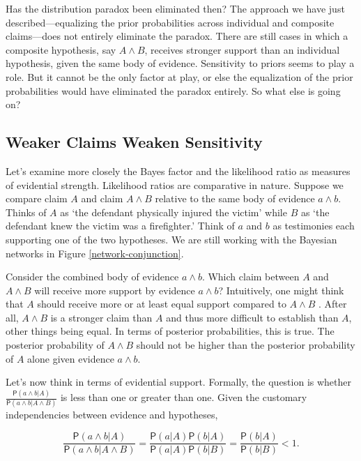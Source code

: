 \documentclass[
  10pt,
  dvipsnames,enabledeprecatedfontcommands]{scrartcl}
\newcommand{\pr}[1]{\mathsf{P}(#1)}
\begin{document}
Has the distribution paradox been eliminated then? The approach we have
just described---equalizing the prior probabilities across individual
and composite claims---does not entirely eliminate the paradox. There
are still cases in which a composite hypothesis, say \(A \wedge B\),
receives stronger support than an individual hypothesis, given the same
body of evidence. Sensitivity to priors seems to play a role. But it
cannot be the only factor at play, or else the equalization of the prior
probabilities would have eliminated the paradox entirely. So what else
is going on?

\hypertarget{weaker-claims-weaken-sensitivity}{%
\subsection{Weaker Claims Weaken
Sensitivity}\label{weaker-claims-weaken-sensitivity}}

Let's examine more closely the Bayes factor and the likelihood ratio as
measures of evidential strength. Likelihood ratios are comparative in
nature. Suppose we compare claim \(A\) and claim \(A\wedge B\) relative
to the same body of evidence \(a\wedge b\). Thinks of \(A\) as `the
defendant physically injured the victim' while \(B\) as `the defendant
knew the victim was a firefighter.' Think of \(a\) and \(b\) as
testimonies each supporting one of the two hypotheses. We are still
working with the Bayesian networks in Figure \ref{network-conjunction}.

Consider the combined body of evidence \(a\wedge b\). Which claim
between \(A\) and \(A\wedge B\) will receive more support by evidence
\(a\wedge b\)? Intuitively, one might think that \(A\) should receive
more or at least equal support compared to \(A\wedge B\) . After all,
\(A\wedge B\) is a stronger claim than \(A\) and thus more difficult to
establish than \(A\), other things being equal. In terms of posterior
probabilities, this is true. The posterior probability of \(A\wedge B\)
should not be higher than the posterior probability of \(A\) alone given
evidence \(a \wedge b\).

Let's now think in terms of evidential support. Formally, the question
is whether
\(\frac{\pr{a\wedge b \vert A}}{\pr{a\wedge b \vert A \wedge B}}\) is
less than one or greater than one. Given the customary independencies
between evidence and hypotheses,

\[\frac{\pr{a\wedge b \vert A}}{\pr{a\wedge b \vert A \wedge B}}=\frac{\pr{a \vert A} \pr{b \vert A}}{\pr{a \vert A} \pr{b \vert B}}=\frac{\pr{b \vert A}}{\pr{b \vert B}}<1.\]
\end{document}
